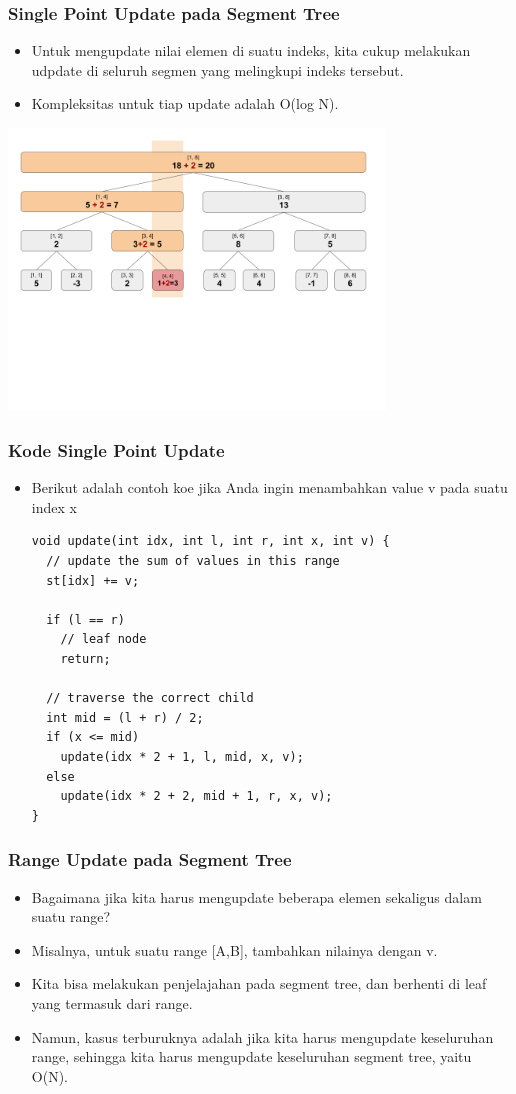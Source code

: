 \begin{frame}
\frametitle{Single Point Update pada Segment Tree}
\begin{itemize}
  \item Untuk mengupdate nilai elemen di suatu indeks, kita cukup melakukan udpdate di seluruh segmen yang melingkupi indeks tersebut.
  \item Kompleksitas untuk tiap update adalah O(log N).
\end{itemize}
\begin{center}
  \includegraphics[width=10cm]{asset/segtree-update.png}
\end{center}
\end{frame}

\begin{frame}[fragile]
\frametitle{Kode Single Point Update}
\begin{itemize}
  \item Berikut adalah contoh koe jika Anda ingin menambahkan value v pada suatu index x
  \begin{lstlisting}
void update(int idx, int l, int r, int x, int v) {
  // update the sum of values in this range
  st[idx] += v;     

  if (l == r) 
    // leaf node
    return;

  // traverse the correct child
  int mid = (l + r) / 2;
  if (x <= mid) 
    update(idx * 2 + 1, l, mid, x, v);
  else 
    update(idx * 2 + 2, mid + 1, r, x, v);
}
\end{lstlisting}
\end{itemize}
\end{frame}

\begin{frame}
\frametitle{Range Update pada Segment Tree}
\begin{itemize}
  \item Bagaimana jika kita harus mengupdate beberapa elemen sekaligus dalam suatu range?
  \item Misalnya, untuk suatu range [A,B], tambahkan nilainya dengan v.
  \item Kita bisa melakukan penjelajahan pada segment tree, dan berhenti di leaf yang termasuk dari range.
  \item Namun, kasus terburuknya adalah jika kita harus mengupdate keseluruhan range, sehingga kita harus mengupdate keseluruhan segment tree, yaitu O(N).
\end{itemize}
\end{frame}

